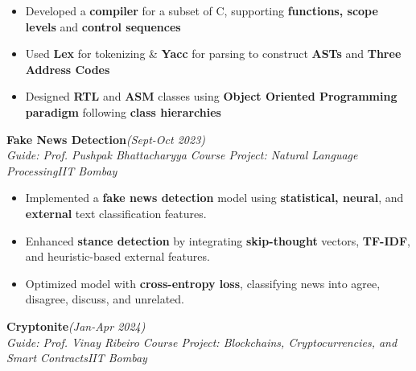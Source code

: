 \documentclass[10 pt]{article}
\begin{document}
		\begin{itemize}[itemsep = -0.8 mm, leftmargin=*]
		\vspace{-16pt}
  \item  Developed a \textbf{compiler} for a subset of C, supporting \textbf{functions, scope levels} and \textbf{control sequences}
\item Used \textbf{Lex} for tokenizing \& \textbf{Yacc} for {parsing} to construct \textbf{ASTs} and \textbf{Three Address Codes}
\item Designed \textbf{RTL} and \textbf{ASM} classes using \textbf{Object Oriented Programming paradigm} following \textbf{class hierarchies}
	\end{itemize}
{\selectfont
		\textbf{{Fake News Detection}}\hfill{\sl \small (Sept-Oct 2023)}\\
	}{\it Guide: Prof. Pushpak Bhattacharyya \textbar} {\it Course Project: Natural Language Processing}\hfill{\sl \small IIT Bombay}\\

		\begin{itemize}[itemsep = -0.8 mm, leftmargin=*]
		\vspace{-16pt}
      \item Implemented a \textbf{fake news detection} model using \textbf{statistical, neural}, and \textbf{external} text classification features.
      \item Enhanced \textbf{stance detection} by integrating \textbf{skip-thought} vectors, \textbf{TF-IDF}, and heuristic-based external features.
      \item Optimized model with \textbf{cross-entropy loss}, classifying news into agree, disagree, discuss, and unrelated.
	\end{itemize}
{\selectfont
		\textbf{{Cryptonite}}\hfill{\sl \small (Jan-Apr 2024)}\\
	}{\it Guide: Prof. Vinay Ribeiro \textbar} {\it Course Project: Blockchains, Cryptocurrencies, and Smart Contracts}\hfill{\sl \small IIT Bombay}\\
\end{document}
